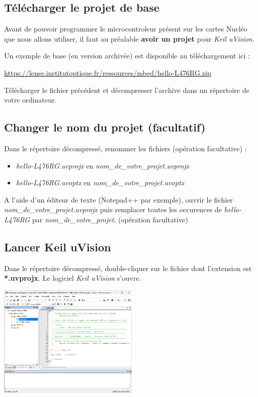 \documentclass[a4paper,11pt,titlepage]{article} %
\begin{document}
\subsection{Télécharger le projet de base}

Avant de pouvoir programmer le microcontroleur présent sur les cartes Nucléo que nous allons utiliser, il faut au préalable \textbf{avoir un projet} pour \textsl{Keil uVision}.

Un exemple de base (en version archivée) est disponible au téléchargement ici : 

\href{https://lense.institutoptique.fr/ressources/mbed/hello-L476RG.zip}{https://lense.institutoptique.fr/ressources/mbed/hello-L476RG.zip}

\Manip Télécharger le fichier précédent et décompresser l'archive dans un répertoire de votre ordinateur.

\subsection{Changer le nom du projet (facultatif)}

\Manip Dans le répertoire décompressé, renommer les fichiers (opération facultative) :

\begin{itemize}
	\item \textsl{hello-L476RG.uvprojx} en \textsl{nom\_de\_votre\_projet.uvprojx}
	\item \textsl{hello-L476RG.uvoptx} en \textsl{nom\_de\_votre\_projet.uvoptx}
\end{itemize}

\Manip A l'aide d'un éditeur de texte (Notepad++ par exemple), ouvrir le fichier \textsl{nom\_de\_votre\_projet.uvprojx} puis remplacer toutes les occurences de \textsl{hello-L476RG} par \textsl{nom\_de\_votre\_projet}. (opération facultative)


\subsection{Lancer Keil uVision}

\Manip Dans le répertoire décompressé, double-cliquer sur le fichier dont l'extension est \textbf{*.uvprojx}. Le logiciel \textit{Keil uVision} s'ouvre.

\begin{center}
	\includegraphics[width=0.5\textwidth]{images/uvision_interface.png}
\end{center}
\end{document}
